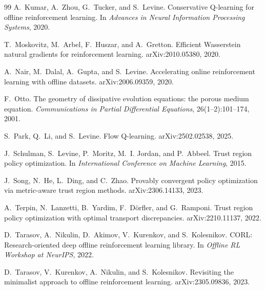 \begin{thebibliography}{99}
A.~Kumar, A.~Zhou, G.~Tucker, and S.~Levine.
\newblock Conservative Q-learning for offline reinforcement learning.
\newblock In \emph{Advances in Neural Information Processing Systems}, 2020.

T.~Moskovitz, M.~Arbel, F.~Huszar, and A.~Gretton.
\newblock Efficient Wasserstein natural gradients for reinforcement learning.
\newblock arXiv:2010.05380, 2020.

A.~Nair, M.~Dalal, A.~Gupta, and S.~Levine.
\newblock Accelerating online reinforcement learning with offline datasets.
\newblock arXiv:2006.09359, 2020.

F.~Otto.
\newblock The geometry of dissipative evolution equations: the porous medium equation.
\newblock \emph{Communications in Partial Differential Equations}, 26(1--2):101--174, 2001.

S.~Park, Q.~Li, and S.~Levine.
\newblock Flow Q-learning.
\newblock arXiv:2502.02538, 2025.

J.~Schulman, S.~Levine, P.~Moritz, M.~I. Jordan, and P.~Abbeel.
\newblock Trust region policy optimization.
\newblock In \emph{International Conference on Machine Learning}, 2015.

J.~Song, N.~He, L.~Ding, and C.~Zhao.
\newblock Provably convergent policy optimization via metric-aware trust region methods.
\newblock arXiv:2306.14133, 2023.

A.~Terpin, N.~Lanzetti, B.~Yardim, F.~D\"orfler, and G.~Ramponi.
\newblock Trust region policy optimization with optimal transport discrepancies.
\newblock arXiv:2210.11137, 2022.

D.~Tarasov, A.~Nikulin, D.~Akimov, V.~Kurenkov, and S.~Kolesnikov.
\newblock CORL: Research-oriented deep offline reinforcement learning library.
\newblock In \emph{Offline RL Workshop at NeurIPS}, 2022.

D.~Tarasov, V.~Kurenkov, A.~Nikulin, and S.~Kolesnikov.
\newblock Revisiting the minimalist approach to offline reinforcement learning.
\newblock arXiv:2305.09836, 2023.


\end{thebibliography}
